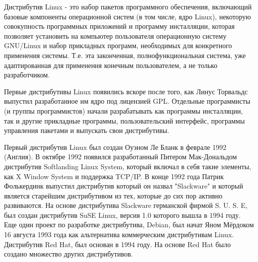\par Дистрибутив Linux - это набор пакетов программного обеспечения, включающий базовые компоненты операционной систем (в том числе, ядро Linux), некоторую совокупность программных приложений и программу инсталляции, которая позволяет установить на компьютер пользователя операционную систему GNU/Linux и набор прикладных программ, необходимых для конкретного применения системы. Т.е. эта законченная, полнофункциональная система, уже адаптированная для применения конечным пользователем, а не только разработчиком.
\par Первые дистрибутивы Linux появились вскоре после того, как Линус Торвальдс выпустил разработанное им ядро под лицензией GPL. Отдельные программисты (и группы программистов) начали разрабатывать как программы инсталляции, так и другие прикладные программы, пользовательский интерфейс, программы управления пакетами и выпускать свои дистрибутивы.
\par Первый дистрибутив Linux был создан Оуэном Ле Бланк в феврале 1992 (Англия). В октябре 1992 появился разработанный Питером Мак-Дональдом дистрибутив Softlanding Linux System, который включал в себя такие элементы, как X Window System и поддержка TCP/IP. В конце 1992 года Патрик Фолькердинк выпустил дистрибутив который он назвал "Slackware" и который является старейшим дистрибутивом из тех, которые до сих пор активно развиваются. На основе дистрибутива Slackware германской фирмой S. U. S. E, был создан дистрибутив SuSE Linux, версия 1.0 которого вышла в 1994 году. Еще один проект по разработке дистрибутива, Debian, был начат Яном Мёрдоком 16 августа 1993 года как альтернатива коммерческим дистрибутивам Linux. Дистрибутив Red Hat, был основан в 1994 году. На основе Red Hat было создано множество других дистрибутивов.
